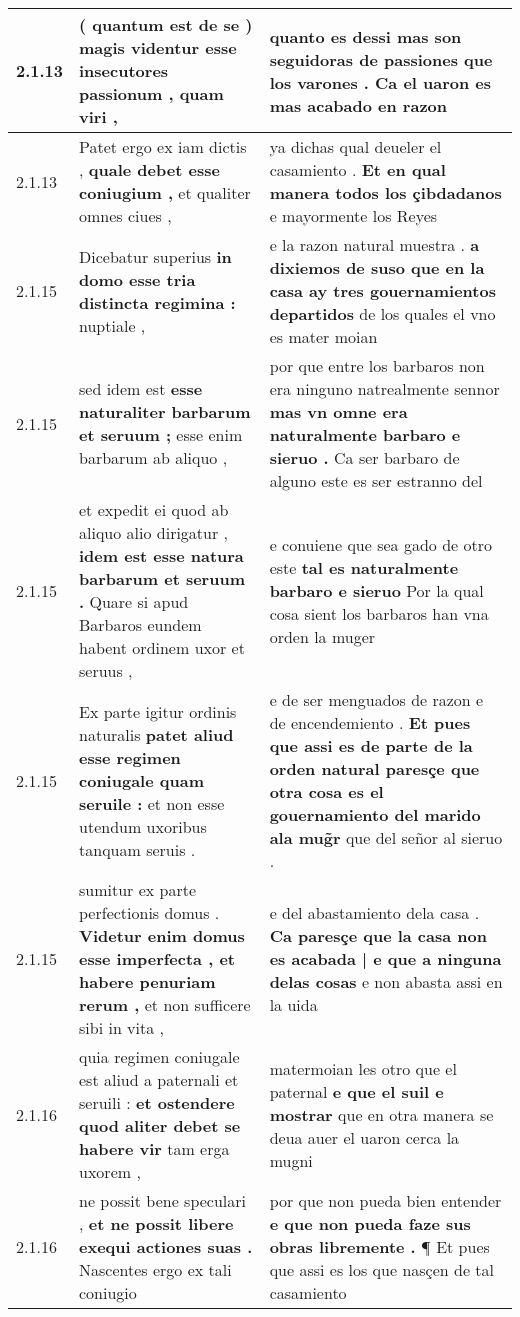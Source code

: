 \begin{tabular}{|p{1cm}|p{6.5cm}|p{6.5cm}|}
2.1.13 & ( quantum est de se ) \textbf{ magis videntur esse insecutores passionum , } quam viri , & quanto es dessi \textbf{ mas son seguidoras de passiones que los varones . } Ca el uaron es mas acabado en razon \\\hline
2.1.13 & Patet ergo ex iam dictis , \textbf{ quale debet esse coniugium , } et qualiter omnes ciues , & ya dichas qual deueler el casamiento . \textbf{ Et en qual manera todos los çibdadanos } e mayormente los Reyes \\\hline
2.1.15 & Dicebatur superius \textbf{ in domo esse tria distincta regimina : } nuptiale , & e la razon natural muestra . \textbf{ a dixiemos de suso que en la casa ay tres gouernamientos departidos } de los quales el vno es mater moian \\\hline
2.1.15 & sed idem est \textbf{ esse naturaliter barbarum et seruum ; } esse enim barbarum ab aliquo , & por que entre los barbaros non era ninguno natrealmente sennor \textbf{ mas vn omne era naturalmente barbaro e sieruo . } Ca ser barbaro de alguno este es ser estranno del \\\hline
2.1.15 & et expedit ei quod ab aliquo alio dirigatur , \textbf{ idem est esse natura barbarum et seruum . } Quare si apud Barbaros eundem habent ordinem uxor et seruus , & e conuiene que sea gado de otro este \textbf{ tal es naturalmente barbaro e sieruo } Por la qual cosa sient los barbaros han vna orden la muger \\\hline
2.1.15 & Ex parte igitur ordinis naturalis \textbf{ patet aliud esse regimen coniugale quam seruile : } et non esse utendum uxoribus tanquam seruis . & e de ser menguados de razon e de encendemiento . \textbf{ Et pues que assi es de parte de la orden natural paresçe que otra cosa es el gouernamiento del marido ala mug̃r } que del señor al sieruo . \\\hline
2.1.15 & sumitur ex parte perfectionis domus . \textbf{ Videtur enim domus esse imperfecta , et habere penuriam rerum , } et non sufficere sibi in vita , & e del abastamiento dela casa . \textbf{ Ca paresçe que la casa non es acabada | e que a ninguna delas cosas } e non abasta assi en la uida \\\hline
2.1.16 & quia regimen coniugale est aliud a paternali et seruili : \textbf{ et ostendere quod aliter debet se habere vir } tam erga uxorem , & matermoian les otro que el paternal \textbf{ e que el suil e mostrar } que en otra manera se deua auer el uaron cerca la mugni \\\hline
2.1.16 & ne possit bene speculari , \textbf{ et ne possit libere exequi actiones suas . } Nascentes ergo ex tali coniugio & por que non pueda bien entender \textbf{ e que non pueda faze sus obras libremente . } ¶ Et pues que assi es los que nasçen de tal casamiento \\\hline

\end{tabular}
